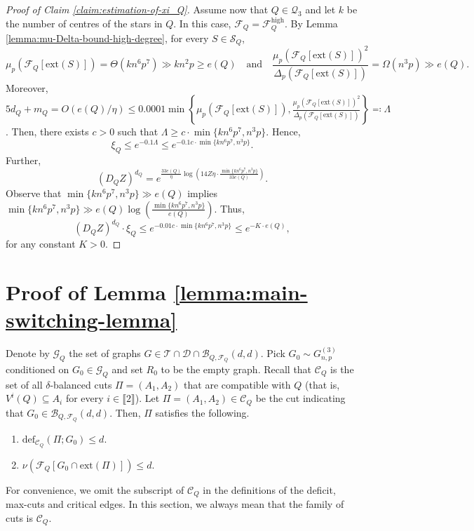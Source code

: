 \documentclass[11pt,a4paper,oneside,reqno]{amsart}
\newcommand{\Gnp}{G_{n, p}^{(3)}}
\newcommand{\cB}{\mathcal{B}}
\newcommand{\cC}{\mathcal{C}}
\newcommand{\cD}{\mathcal{D}}
\newcommand{\cF}{\mathcal{F}}
\newcommand{\cG}{\mathcal{G}}
\newcommand{\cQ}{\mathcal{Q}}
\newcommand{\cS}{\mathcal{S}}
\newcommand{\cT}{\mathcal{T}}
\newcommand{\1}{\mathbbm{1}} %
\newcommand{\br}[1]{\llbracket{#1}\rrbracket}
\renewcommand{\le}{\leqslant}
\renewcommand{\ge}{\geqslant}
\newcommand{\cFQH}{\cF_Q^{\mathrm{high}}}
\newcommand{\deficit}{\mathrm{def}}
\newcommand{\ext}{\mathrm{ext}}
\begin{document}
\begin{proof}[Proof of Claim \ref{claim:estimation-of-xi_Q}]
    Assume now that $Q \in \cQ_3$ and let $k$ be the number of centres of the stars in $Q$. In this case, $\cF_Q = \cFQH$. By Lemma \ref{lemma:mu-Delta-bound-high-degree}, for every $S \in \cS_Q$,
    \[
        \mu_p\left(\cF_Q\left[\ext(S)\right]\right) = \Theta( k n^6 p^7) \gg k n^2 p \ge e(Q) \quad \text{and} \quad \frac{\mu_p\left(\cF_Q\left[\ext(S)\right]\right)^2}{\Delta_p\left(\cF_Q\left[\ext(S)\right]\right)} = \Omega(n^3 p) \gg e(Q).
    \]
    Moreover, $5d_Q + m_Q = O(e(Q)/\eta) \le 0.0001 \min\left\{\mu_p\left(\cF_Q\left[\ext(S)\right]\right), \frac{\mu_p\left(\cF_Q\left[\ext(S)\right]\right)^2}{\Delta_p\left(\cF_Q\left[\ext(S)\right]\right)}\right\} \eqqcolon \Lambda $. Then, there exists $c > 0$ such that $\Lambda \ge c \cdot \min\{k n^6 p^7, n^3 p\}$.
    Hence, 
    \[
        \xi_Q \le e^{-0.1\Lambda} \le e^{-0.1 c \cdot \min\{k n^6 p^7, n^3 p\}}.
    \]
    Further,
    \[
        (D_Q Z)^{d_Q} = e^{\frac{33e(Q)}{\eta} \log\left(14 Z \eta \cdot \frac{\min\{kn^6 p^7, n^3p\}}{33e(Q)}\right)}.
    \]
    Observe that $\min\{k n^6 p^7, n^3 p\} \gg e(Q)$ implies $\min\{k n^6 p^7, n^3 p\} \gg e(Q) \log\left(\frac{\min\{k n^6 p^7, n^3 p\}}{e(Q)}\right)$. Thus,
    \[
        (D_Q Z)^{d_Q} \cdot \xi_Q \le e^{-0.01 c \cdot \min\{k n^6 p^7, n^3 p\}} \le e^{-K \cdot e(Q)},
    \]
    for any constant $K > 0$.
\end{proof}

\section{Proof of Lemma \ref{lemma:main-switching-lemma}}\label{section:proof-of-switching-lemma}
Denote by $\cG_Q$ the set of graphs $G \in \cT \cap \cD \cap \cB_{Q, \cF_Q}(d, d)$.
Pick $G_0 \sim \Gnp$ conditioned on $G_0 \in \cG_Q$ and set $R_0$ to be the empty graph. Recall that $\cC_Q$ is the set of all $\delta$-balanced cuts $\Pi = (A_1, A_2)$ that are compatible with $Q$ (that is, $V^i(Q) \subseteq A_i$ for every $i \in \br{2}$). Let $\Pi = (A_1, A_2) \in \cC_Q$ be the cut indicating that $G_0 \in \cB_{Q, \cF_Q}(d, d)$. Then, $\Pi$ satisfies the following.
\begin{enumerate}
    \item $\deficit_{\cC_Q}(\Pi; G_0) \le d$.
    \item $\nu\left(\cF_Q\left[G_0 \cap \ext\left(\Pi\right)\right]\right) \le d$.
\end{enumerate}
For convenience, we omit the subscript of $\cC_Q$ in the definitions of the deficit, max-cuts and critical edges. In this section, we always mean that the family of cuts is $\cC_Q$.
\end{document}
